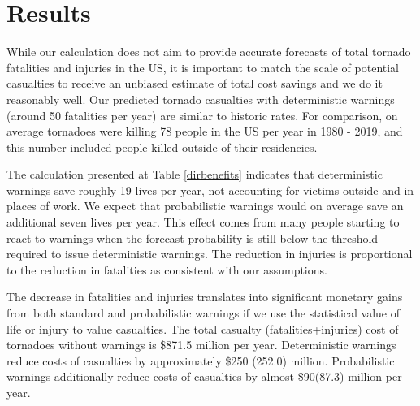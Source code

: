 \documentclass{ametsocV6.1}
\begin{document}
\section{Results}

While our calculation does not aim to provide accurate forecasts of total tornado fatalities and injuries in the US, it is important to match the scale of potential casualties to receive an unbiased estimate of total cost savings and we do it reasonably well.  Our predicted tornado casualties with deterministic warnings (around 50 fatalities per year) are similar to historic rates. For comparison, on average tornadoes were killing 78 people in the US per year in 1980 - 2019, and this number included people killed outside of their residencies.  

The calculation presented at Table \ref{dirbenefits} indicates that deterministic warnings save roughly 19 lives per year, not accounting for victims outside and in places of work. We expect that probabilistic warnings would on average save an additional seven lives per year. This effect comes from many people starting to react to warnings when the forecast probability is still below the threshold required to issue deterministic warnings. The reduction in injuries is proportional to the reduction in fatalities as consistent with our assumptions.

The decrease in fatalities and injuries translates into significant monetary gains from both standard and probabilistic warnings if we use the statistical value of life or injury to value casualties. The total casualty (fatalities+injuries) cost of tornadoes without warnings is \$871.5 million per year. Deterministic warnings reduce costs of casualties by  approximately \$250 (252.0) million. Probabilistic warnings additionally reduce costs of casualties by almost \$90(87.3) million per year.


\end{document}
